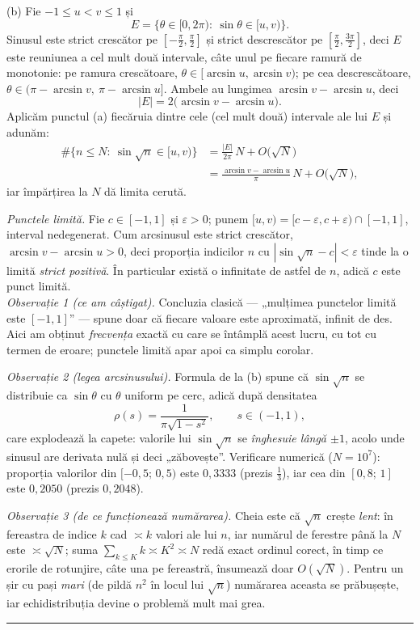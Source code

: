 (b) Fie $-1\le u<v\le1$ și
\[ E=\bigl\{\theta\in[0,2\pi):\ \sin\theta\in[u,v)\bigr\} . \]
Sinusul este strict crescător pe $\left[-\frac\pi2,\frac\pi2\right]$ și strict descrescător pe $\left[\frac\pi2,\frac{3\pi}{2}\right]$, deci $E$ este reuniunea a cel mult două intervale, câte unul pe fiecare ramură de monotonie: pe ramura crescătoare, $\theta\in[\arcsin u,\arcsin v)$; pe cea descrescătoare, $\theta\in\bigl(\pi-\arcsin v,\ \pi-\arcsin u\bigr]$. Ambele au lungimea $\arcsin v-\arcsin u$, deci
\[ |E|=2\bigl(\arcsin v-\arcsin u\bigr) . \]
Aplicăm punctul (a) fiecăruia dintre cele (cel mult două) intervale ale lui $E$ și adunăm:
\[ \begin{aligned} \#\bigl\{n\le N:\ \sin\sqrt n\in[u,v)\bigr\}&=\frac{|E|}{2\pi}\,N+O\bigl(\sqrt N\bigr)\\ &=\frac{\arcsin v-\arcsin u}{\pi}\,N+O\bigl(\sqrt N\bigr) , \end{aligned} \]
iar împărțirea la $N$ dă limita cerută.

\emph{Punctele limită.} Fie $c\in[-1,1]$ și $\varepsilon>0$; punem $[u,v)=[c-\varepsilon,c+\varepsilon)\cap[-1,1]$, interval nedegenerat. Cum arcsinusul este strict crescător, $\arcsin v-\arcsin u>0$, deci proporția indicilor $n$ cu $|\sin\sqrt n-c|<\varepsilon$ tinde la o limită \emph{strict pozitivă}. În particular există o infinitate de astfel de $n$, adică $c$ este punct limită.\\[2pt]
\emph{Observație 1 (ce am câștigat).} Concluzia clasică --- „mulțimea punctelor limită este $[-1,1]$'' --- spune doar că fiecare valoare este aproximată, infinit de des. Aici am obținut \emph{frecvența} exactă cu care se întâmplă acest lucru, cu tot cu termen de eroare; punctele limită apar apoi ca simplu corolar.

\emph{Observație 2 (legea arcsinusului).} Formula de la (b) spune că $\sin\sqrt n$ se distribuie ca $\sin\theta$ cu $\theta$ uniform pe cerc, adică după densitatea
\[ \rho(s)=\frac{1}{\pi\sqrt{1-s^{2}}},\qquad s\in(-1,1) , \]
care explodează la capete: valorile lui $\sin\sqrt n$ se \emph{înghesuie lângă $\pm1$}, acolo unde sinusul are derivata nulă și deci „zăbovește''. Verificare numerică ($N=10^{7}$): proporția valorilor din $[-0{,}5;\,0{,}5)$ este $0{,}3333$ (prezis $\frac13$), iar cea din $[0{,}8;\,1]$ este $0{,}2050$ (prezis $0{,}2048$).

\emph{Observație 3 (de ce funcționează numărarea).} Cheia este că $\sqrt n$ crește \emph{lent}: în fereastra de indice $k$ cad $\asymp k$ valori ale lui $n$, iar numărul de ferestre până la $N$ este $\asymp\sqrt N$; suma $\sum_{k\le K}k\asymp K^{2}\asymp N$ redă exact ordinul corect, în timp ce erorile de rotunjire, câte una pe fereastră, însumează doar $O(\sqrt N)$. Pentru un șir cu pași \emph{mari} (de pildă $n^{2}$ în locul lui $\sqrt n$) numărarea aceasta se prăbușește, iar echidistribuția devine o problemă mult mai grea.
\vspace{1mm}\hrule

